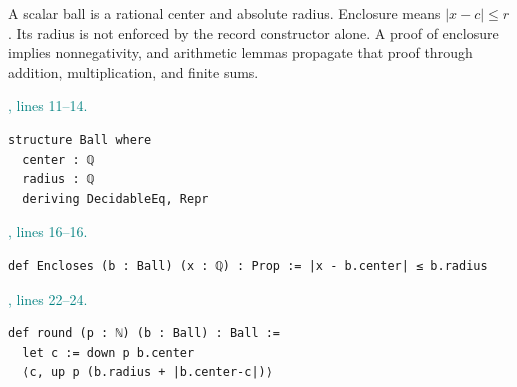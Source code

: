 \documentclass[11pt]{article}\usepackage{needspace}\renewcommand{\paperkind}{Lean companion}\setlength{\parskip}{0.35em}
\begin{document}
A scalar ball is a rational center and absolute radius. Enclosure means $|x-c|\le r$. Its radius is not enforced by the record constructor alone. A proof of enclosure implies nonnegativity, and arithmetic lemmas propagate that proof through addition, multiplication, and finite sums.



{\small\textcolor{teal}{, lines 11--14.}\par}

\begin{lstlisting}[style=BayesSource]
structure Ball where
  center : ℚ
  radius : ℚ
  deriving DecidableEq, Repr
\end{lstlisting}



{\small\textcolor{teal}{, lines 16--16.}\par}

\begin{lstlisting}[style=BayesSource]
def Encloses (b : Ball) (x : ℚ) : Prop := |x - b.center| ≤ b.radius
\end{lstlisting}



{\small\textcolor{teal}{, lines 22--24.}\par}

\begin{lstlisting}[style=BayesSource]
def round (p : ℕ) (b : Ball) : Ball :=
  let c := down p b.center
  ⟨c, up p (b.radius + |b.center-c|)⟩
\end{lstlisting}


\end{document}
